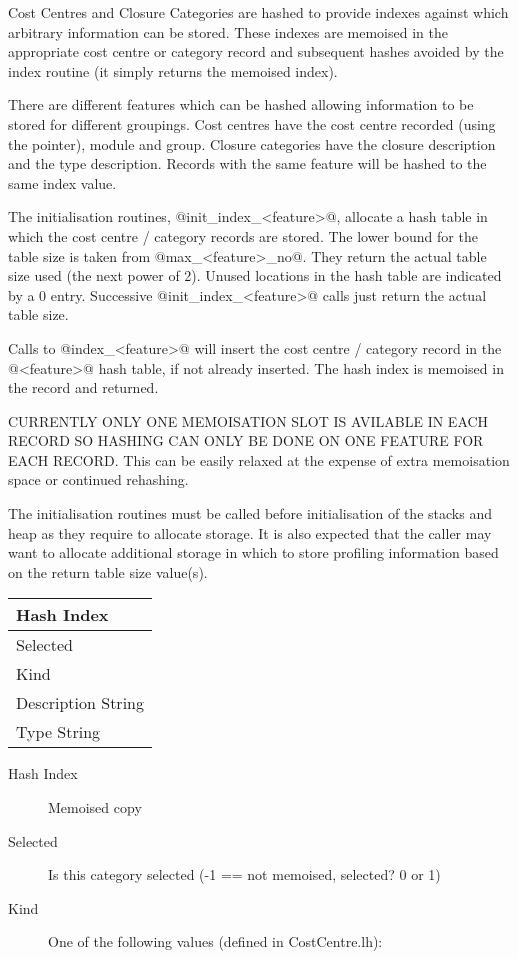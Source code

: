 \documentclass[11pt]{article}
\begin{document}
\begin{itemize}
Cost Centres and Closure Categories are hashed to provide indexes
against which arbitrary information can be stored. These indexes are
memoised in the appropriate cost centre or category record and
subsequent hashes avoided by the index routine (it simply returns the
memoised index).

There are different features which can be hashed allowing information
to be stored for different groupings. Cost centres have the cost
centre recorded (using the pointer), module and group. Closure
categories have the closure description and the type
description. Records with the same feature will be hashed to the same
index value.

The initialisation routines, @init_index_<feature>@, allocate a hash
table in which the cost centre / category records are stored. The
lower bound for the table size is taken from @max_<feature>_no@. They
return the actual table size used (the next power of 2). Unused
locations in the hash table are indicated by a 0 entry. Successive
@init_index_<feature>@ calls just return the actual table size.

Calls to @index_<feature>@ will insert the cost centre / category
record in the @<feature>@ hash table, if not already inserted. The hash
index is memoised in the record and returned. 

CURRENTLY ONLY ONE MEMOISATION SLOT IS AVILABLE IN EACH RECORD SO
HASHING CAN ONLY BE DONE ON ONE FEATURE FOR EACH RECORD. This can be
easily relaxed at the expense of extra memoisation space or continued
rehashing.

The initialisation routines must be called before initialisation of
the stacks and heap as they require to allocate storage. It is also
expected that the caller may want to allocate additional storage in
which to store profiling information based on the return table size
value(s).

\begin{center}
\begin{tabular}{|l|}
   \hline Hash Index
\\ \hline Selected
\\ \hline Kind
\\ \hline Description String
\\ \hline Type String
\\ \hline
\end{tabular}
\end{center}

\begin{description}
\item[Hash Index] Memoised copy
\item[Selected] 
  Is this category selected (-1 == not memoised, selected? 0 or 1)
\item[Kind]
One of the following values (defined in CostCentre.lh):


\end{description}
\end{itemize}
\end{document}
